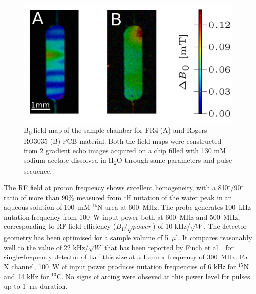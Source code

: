 \documentclass[preprint,5p]{elsarticle}
\begin{document}
\begin{figure}
\centering
\includegraphics[width=.7\linewidth,keepaspectratio=true]{./figures/pcb-fieldmap-colorbar.png} 
\caption{B\textsubscript{0} field map of the sample chamber for FR4 (A) and Rogers RO3035 (B) PCB material. Both the field maps were constructed from 2 gradient echo images acquired on a chip filled with 130 mM sodium acetate dissolved in H\textsubscript{2}O through same parameters and pulse sequence.}
\label{fig:field map} 
\end{figure}

The RF field at proton frequency shows excellent homogeneity, with a 810$^{\circ}$/90$^{\circ}$ 
ratio of more than 90\% measured from $^1$H nutation of the water peak in an aqueous solution of 
100~mM $^{15}$N-urea at 600~MHz. The probe generates 100~kHz nutation frequency from 100~W input power both at 
600~MHz and 500~MHz, corresponding to RF field efficiency ($B_{1}/\sqrt{power}$) of 10 kHz/$\sqrt{W}$. 
The detector geometry has been optimised for a sample volume of 5~$\mu$l. It compares reasonably well to
the value of 22 kHz/$\sqrt{W}$ that has been reported by Finch et al.~\cite{gream_2016} for single-frequency detector 
of half this size at a Larmor frequency of 300~MHz. 
For X channel, 100~W of input power 
produces nutation frequencies of 6 kHz for $^{15}$N and 14 kHz for $^{13}$C. 
No signs of arcing were obseved at this power level for pulses up to 1~ms duration.

\end{document}
